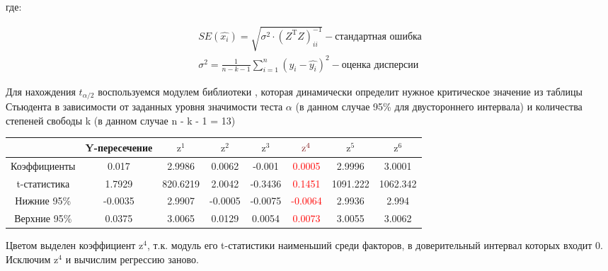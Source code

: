 где:

\vspace{-1\baselineskip}

\begin{align*}
    SE(\hat{x_i}) = \sqrt{\sigma^2 \cdot (Z^{\textrm{T}}Z)^{-1}_{ii}} - \textrm{стандартная ошибка} \\
    \sigma^2 = \frac{1}{n - k - 1} \sum_{i = 1}^{n} (y_i - \hat{y_i})^2 - \textrm{оценка дисперсии} 
\end{align*}

Для нахождения $t_{\alpha/2}$ воспользуемся модулем  библиотеки , которая динамически определит нужное критическое значение из таблицы Стьюдента в зависимости от заданных уровня значимости теста $\alpha$ (в данном случае 95\% для двустороннего интервала) и количества степеней свободы k (в данном случае n - k - 1 = 13)

\renewcommand{\arraystretch}{0.65}
\begin{center}
    \begin{tabular}{ | c | c | c | c | c | c | c | c | } 
      \hline
       & Y-пересечение & $\textrm{z}^1$ & $\textrm{z}^2$ & $\textrm{z}^3$ & $\textcolor{RED}{\textrm{z}^4}$ & $\textrm{z}^5$ & $\textrm{z}^6$ \\
      \hline
      Коэффициенты & 0.017 & 2.9986 & 0.0062 & -0.001 & \textcolor{RED}{0.0005} & 2.9996 & 3.0001 \\ 
      \hline 
      t-статистика & 1.7929 & 820.6219 & 2.0042 & -0.3436 & \textcolor{RED}{0.1451} & 1091.222 & 1062.342 \\ 
      \hline 
      Нижние 95\% & -0.0035 & 2.9907 & -0.0005 & -0.0075 & \textcolor{RED}{-0.0064} & 2.9936 & 2.994 \\ 
      \hline 
      Верхние 95\% & 0.0375 & 3.0065 & 0.0129 & 0.0054 & \textcolor{RED}{0.0073} & 3.0055 & 3.0062 \\ 
      \hline 
    \end{tabular}
\end{center}

\vspace{1\baselineskip}

Цветом выделен коэффициент $\textrm{z}^4$, т.к. модуль его t-статистики наименьший среди факторов, в доверительный интервал которых входит 0. Исключим $\textrm{z}^4$ и вычислим регрессию заново.

